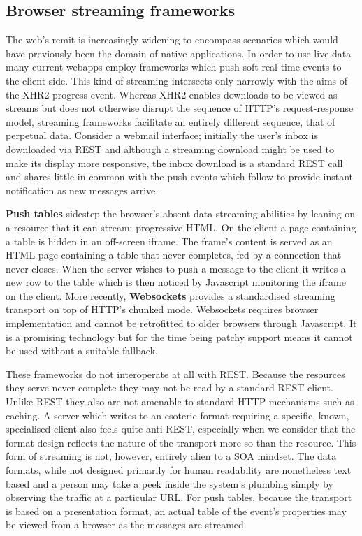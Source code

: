 \documentclass[12pt, ]{article}
\begin{document}
\subsection{Browser streaming
frameworks}\label{browser-streaming-frameworks}

\label{browserstreamingframeworks}

The web's remit is increasingly widening to encompass scenarios which
would have previously been the domain of native applications. In order
to use live data many current webapps employ frameworks which push
soft-real-time events to the client side. This kind of streaming
intersects only narrowly with the aims of the XHR2 progress event.
Whereas XHR2 enables downloads to be viewed as streams but does not
otherwise disrupt the sequence of HTTP's request-response model,
streaming frameworks facilitate an entirely different sequence, that of
perpetual data. Consider a webmail interface; initially the user's inbox
is downloaded via REST and although a streaming download might be used
to make its display more responsive, the inbox download is a standard
REST call and shares little in common with the push events which follow
to provide instant notification as new messages arrive.

\textbf{Push tables} sidestep the browser's absent data streaming
abilities by leaning on a resource that it can stream: progressive HTML.
On the client a page containing a table is hidden in an off-screen
iframe. The frame's content is served as an HTML page containing a table
that never completes, fed by a connection that never closes. When the
server wishes to push a message to the client it writes a new row to the
table which is then noticed by Javascript monitoring the iframe on the
client. More recently, \textbf{Websockets} provides a standardised
streaming transport on top of HTTP's chunked mode. Websockets requires
browser implementation and cannot be retrofitted to older browsers
through Javascript. It is a promising technology but for the time being
patchy support means it cannot be used without a suitable fallback.

These frameworks do not interoperate at all with REST. Because the
resources they serve never complete they may not be read by a standard
REST client. Unlike REST they also are not amenable to standard HTTP
mechanisms such as caching. A server which writes to an esoteric format
requiring a specific, known, specialised client also feels quite
anti-REST, especially when we consider that the format design reflects
the nature of the transport more so than the resource. This form of
streaming is not, however, entirely alien to a SOA mindset. The data
formats, while not designed primarily for human readability are
nonetheless text based and a person may take a peek inside the system's
plumbing simply by observing the traffic at a particular URL. For push
tables, because the transport is based on a presentation format, an
actual table of the event's properties may be viewed from a browser as
the messages are streamed.
\end{document}
